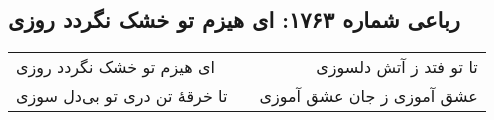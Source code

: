 \begin{center}
\section*{رباعی شماره ۱۷۶۳: ای هیزم تو خشک نگردد روزی}
\label{sec:1763}
\begin{longtable}{l p{0.5cm} r}
ای هیزم تو خشک نگردد روزی
&&
تا تو فتد ز آتش دلسوزی
\\
تا خرقهٔ تن دری تو بی‌دل سوزی
&&
عشق آموزی ز جان عشق آموزی
\\
\end{longtable}
\end{center}
